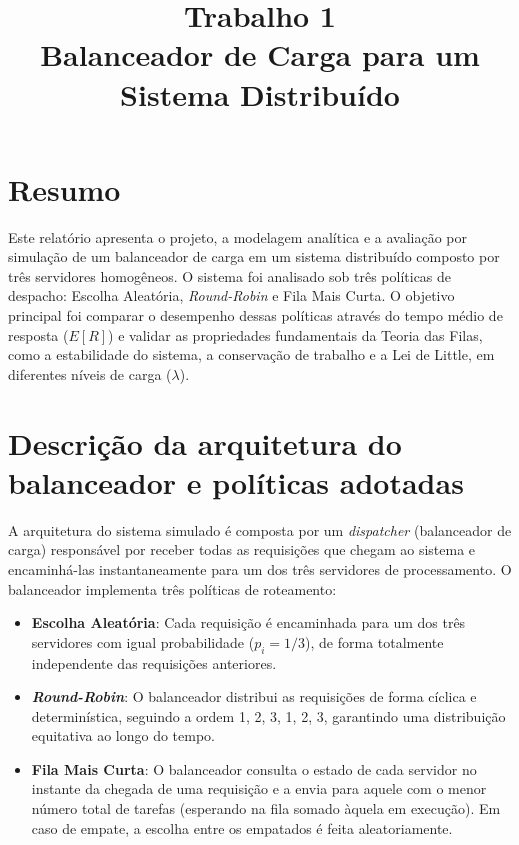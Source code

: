 \documentclass[conference]{IEEE_Conference_Template/IEEEtran}
\begin{document}
\pagestyle{fancy}
\fancyhf{}
\fancyfoot[C]{\thepage}
\renewcommand{\headrulewidth}{0pt}

\title{Trabalho 1\\
\large Balanceador de Carga para um Sistema Distribuído}

\author{
\and
{}
}

\maketitle
\thispagestyle{plain}
\pagestyle{plain}

\section{Resumo}
Este relatório apresenta o projeto, a modelagem analítica e a avaliação por simulação de um balanceador de carga em um sistema distribuído composto por três servidores homogêneos. O sistema foi analisado sob três políticas de despacho: Escolha Aleatória, \textit{Round-Robin} e Fila Mais Curta. O objetivo principal foi comparar o desempenho dessas políticas através do tempo médio de resposta ($E[R]$) e validar as propriedades fundamentais da Teoria das Filas, como a estabilidade do sistema, a conservação de trabalho e a Lei de Little, em diferentes níveis de carga ($\lambda$).

\section{Descrição da arquitetura do balanceador e políticas adotadas}
A arquitetura do sistema simulado é composta por um \textit{dispatcher} (balanceador de carga) responsável por receber todas as requisições que chegam ao sistema e encaminhá-las instantaneamente para um dos três servidores de processamento. O balanceador implementa três políticas de roteamento:
\begin{itemize}
    \item \textbf{Escolha Aleatória}: Cada requisição é encaminhada para um dos três servidores com igual probabilidade ($p_i = 1/3$), de forma totalmente independente das requisições anteriores.
    \item \textbf{\textit{Round-Robin}}: O balanceador distribui as requisições de forma cíclica e determinística, seguindo a ordem 1, 2, 3, 1, 2, 3, garantindo uma distribuição equitativa ao longo do tempo.
    \item \textbf{Fila Mais Curta}: O balanceador consulta o estado de cada servidor no instante da chegada de uma requisição e a envia para aquele com o menor número total de tarefas (esperando na fila somado àquela em execução). Em caso de empate, a escolha entre os empatados é feita aleatoriamente.
\end{itemize}
\end{document}
